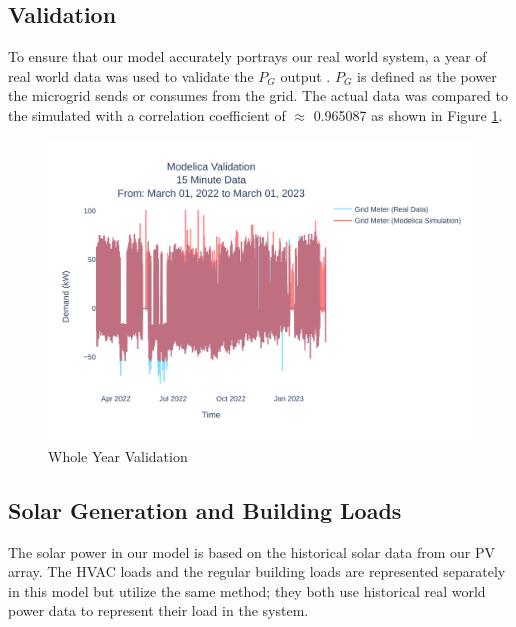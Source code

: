 \documentclass[conference]{IEEEtran}
\begin{document}
	\subsection{Validation}
		To ensure that our model accurately portrays our real world system, a year of real world data was used to validate the $P_G $ output . $P_G$ is defined as the power the microgrid sends or consumes from the grid.  The actual data was compared to the simulated  with a correlation coefficient of  $\approx$ 0.965087 as shown in Figure \ref{fig:ucr15minutedatamar012022tomar012023}. 
		\begin{figure}[H]
			\centering
			\includegraphics[width=1\linewidth]{Fig/ucr_15_Minute_Data_Mar_01_2022_to_Mar_01_2023}
			\caption{Whole Year Validation}
			\label{fig:ucr15minutedatamar012022tomar012023}
		\end{figure}
		
    \subsection{Solar Generation and Building Loads}
    	The solar power in our model is based on the historical solar data from our PV array. The HVAC loads and the regular building loads are represented separately in this model but utilize the same method; they both use historical real world power data to represent their load in the system. 
\end{document}

